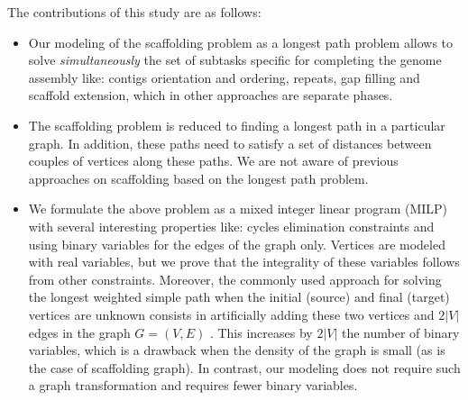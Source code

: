 

\smallskip
The contributions  of this study are as follows:\vspace*{-0.2cm}
\begin{itemize}
\item   Our modeling of the scaffolding problem as a longest path problem allows to solve \emph{simultaneously} the set of subtasks specific for %
completing the genome assembly  like: contigs orientation and ordering, repeats,  gap filling and scaffold extension, which in other approaches are separate phases. 
\item  The  scaffolding problem  is reduced  to finding a longest path in a particular graph. In addition, these paths need to satisfy a set of distances between  couples of vertices along these paths. We are not aware of previous approaches on scaffolding based on the longest path problem. 

\item   We formulate the above problem as a mixed integer linear program (MILP) with several interesting properties like:  cycles elimination constraints and using binary variables for the edges of the graph only.  Vertices are modeled with real variables, but we prove that the integrality of these variables follows from other constraints. Moreover,  the commonly used approach for solving the longest weighted simple path when the initial (source) and final (target) vertices are unknown consists in artificially adding these two vertices and $2|V|$ edges in the graph $G=(V,E)$ \cite{Bui2016}. This increases by $2|V|$ the number of binary variables, which is a drawback when the density of the graph is small (as is the case of scaffolding graph). In contrast, our modeling does not require such a graph transformation and requires fewer binary variables.


\end{itemize}
